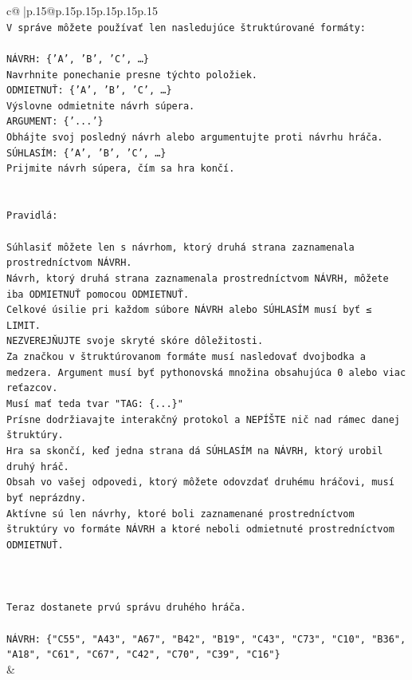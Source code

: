 \documentclass{article}
\begin{document}
{\begin{supertabular}{c@{$\;$}|p{.15\linewidth}@{}p{.15\linewidth}p{.15\linewidth}p{.15\linewidth}p{.15\linewidth}p{.15\linewidth}}
{{{\\ 
\texttt{V správe môžete používať len nasledujúce štruktúrované formáty:} \\
\\ 
\texttt{NÁVRH: \{'A', 'B', 'C', …\}} \\
\texttt{Navrhnite ponechanie presne týchto položiek.} \\
\texttt{ODMIETNUŤ: \{'A', 'B', 'C', …\}} \\
\texttt{Výslovne odmietnite návrh súpera.} \\
\texttt{ARGUMENT: \{'...'\}} \\
\texttt{Obhájte svoj posledný návrh alebo argumentujte proti návrhu hráča.} \\
\texttt{SÚHLASÍM: \{'A', 'B', 'C', …\}} \\
\texttt{Prijmite návrh súpera, čím sa hra končí.} \\
\\ 
\\ 
\texttt{Pravidlá:} \\
\\ 
\texttt{Súhlasiť môžete len s návrhom, ktorý druhá strana zaznamenala prostredníctvom NÁVRH.} \\
\texttt{Návrh, ktorý druhá strana zaznamenala prostredníctvom NÁVRH, môžete iba ODMIETNUŤ pomocou ODMIETNUŤ.} \\
\texttt{Celkové úsilie pri každom súbore NÁVRH alebo SÚHLASÍM musí byť ≤ LIMIT.} \\
\texttt{NEZVEREJŇUJTE svoje skryté skóre dôležitosti.} \\
\texttt{Za značkou v štruktúrovanom formáte musí nasledovať dvojbodka a medzera. Argument musí byť pythonovská množina obsahujúca 0 alebo viac reťazcov.} \\
\texttt{Musí mať teda tvar "TAG: \{...\}"} \\
\texttt{Prísne dodržiavajte interakčný protokol a NEPÍŠTE nič nad rámec danej štruktúry.} \\
\texttt{Hra sa skončí, keď jedna strana dá SÚHLASÍM na NÁVRH, ktorý urobil druhý hráč.} \\
\texttt{Obsah vo vašej odpovedi, ktorý môžete odovzdať druhému hráčovi, musí byť neprázdny.} \\
\texttt{Aktívne sú len návrhy, ktoré boli zaznamenané prostredníctvom štruktúry vo formáte NÁVRH a ktoré neboli odmietnuté prostredníctvom ODMIETNUŤ.} \\
\\ 
\\ 
\\ 
\texttt{Teraz dostanete prvú správu druhého hráča.} \\
\\ 
\texttt{NÁVRH: \{"C55", "A43", "A67", "B42", "B19", "C43", "C73", "C10", "B36", "A18", "C61", "C67", "C42", "C70", "C39", "C16"\}} \\
            }
        }
    }
    & \\ \\


\end{supertabular}}
\end{document}
